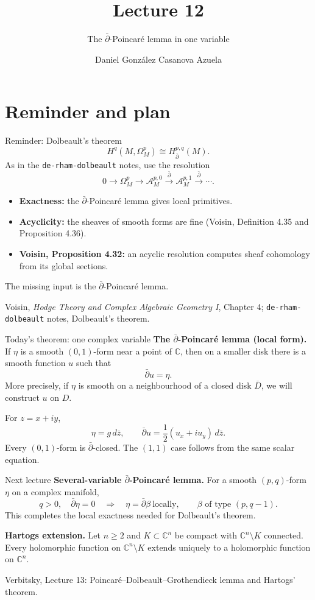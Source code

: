 \documentclass[aspectratio=169,11pt]{beamer}
\title{Lecture 12}
\subtitle{The \texorpdfstring{$\bar\partial$}{dbar}-Poincar\'e lemma in one variable}
\author{Daniel Gonz\'alez Casanova Azuela}
\date{}
\newcommand{\db}{\bar\partial}
\newcommand{\C}{\mathbb C}
\newcommand{\A}{\mathcal A}
\newcommand{\src}[1]{\par\vfill{\scriptsize #1\par}}
\begin{document}
\begin{frame}
\titlepage
\end{frame}

\section{Reminder and plan}
\begin{frame}{Reminder: Dolbeault's theorem}
\[
 H^q(M,\Omega^p_M)\cong H^{p,q}_{\db}(M).
\]
As in the \texttt{de-rham-dolbeault} notes, use the resolution
\[
 0\longrightarrow\Omega^p_M\longrightarrow\A^{p,0}_M
 \xrightarrow{\db}\A^{p,1}_M\xrightarrow{\db}\cdots.
\]
\begin{itemize}
\item \textbf{Exactness:} the $\db$-Poincar\'e lemma gives local primitives.
\item \textbf{Acyclicity:} the sheaves of smooth forms are fine
(Voisin, Definition 4.35 and Proposition 4.36).
\item \textbf{Voisin, Proposition 4.32:} an acyclic resolution computes
sheaf cohomology from its global sections.
\end{itemize}
The missing input is the $\db$-Poincar\'e lemma.
\src{Voisin, \emph{Hodge Theory and Complex Algebraic Geometry I}, Chapter 4;\newline
\texttt{de-rham-dolbeault} notes, Dolbeault's theorem.}
\end{frame}

\begin{frame}{Today's theorem: one complex variable}
\textbf{The $\db$-Poincar\'e lemma (local form).}
If $\eta$ is a smooth $(0,1)$-form near a point of $\C$, then
on a smaller disk there is a smooth function $u$ such that
\[
 \db u=\eta.
\]
More precisely, if $\eta$ is smooth on a neighbourhood of a closed disk
$\overline D$, we will construct $u$ on $D$.

For $z=x+iy$,
\[
 \eta=g\,d\bar z,\qquad
 \db u=\frac12(u_x+i u_y)\,d\bar z.
\]
Every $(0,1)$-form is $\db$-closed.
The $(1,1)$ case follows from the same scalar equation.
\end{frame}

\begin{frame}{Next lecture}
\textbf{Several-variable $\db$-Poincar\'e lemma.}
For a smooth $(p,q)$-form $\eta$ on a complex manifold,
\[
 q>0,\quad\db\eta=0
 \quad\Longrightarrow\quad
 \eta=\db\beta\ \text{locally},
 \qquad \beta\text{ of type }(p,q-1).
\]
This completes the local exactness needed for Dolbeault's theorem.

\textbf{Hartogs extension.}
Let $n\geq2$ and $K\subset\C^n$ be compact with $\C^n\setminus K$
connected. Every holomorphic function on $\C^n\setminus K$
extends uniquely to a holomorphic function on $\C^n$.
\src{Verbitsky, Lecture 13: Poincar\'e--Dolbeault--Grothendieck lemma and Hartogs' theorem.}
\end{frame}
\end{document}
